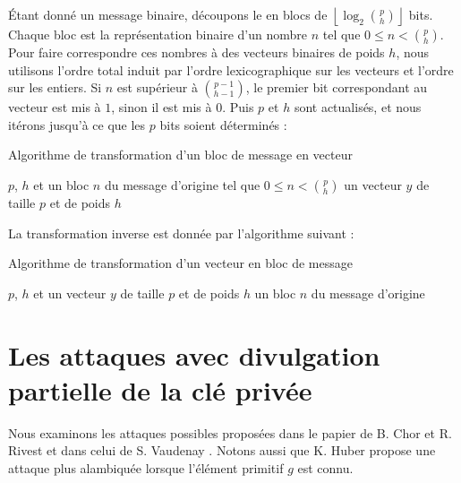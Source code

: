 \documentclass[a4paper, titlepage]{article}
\theoremstyle{definition}
\theoremstyle{remark}
\def\floor #1{\left\lfloor#1\right\rfloor}
\begin{document}
\'Etant donné un message binaire, découpons le en blocs de $\floor{\log_2\binom{p}{h}}$ bits. Chaque bloc est la représentation binaire d'un nombre $n$ tel que $0\leqslant n < \binom{p}{h}$. Pour faire correspondre ces nombres à des vecteurs binaires de poids $h$, nous utilisons l'ordre total induit par l'ordre lexicographique sur les vecteurs et l'ordre sur les entiers. Si $n$ est supérieur à $\binom{p-1}{h-1}$, le premier bit correspondant au vecteur est mis à $1$, sinon il est mis à $0$. Puis $p$ et $h$ sont actualisés, et nous itérons jusqu'à ce que les $p$ bits soient déterminés :

\begin{algorithm}[h]
\caption{Algorithme de transformation d'un bloc de message en vecteur}
\begin{algorithmic}[1]
\REQUIRE $p$, $h$ et un bloc $n$ du message d'origine tel que $0\leqslant n < \binom{p}{h}$
\ENSURE un vecteur $y$ de taille $p$ et de poids $h$
	\ELSE
	\ENDIF
\ENDFOR
{}
\end{algorithmic}
\end{algorithm}

La transformation inverse est donnée par l'algorithme suivant :
\begin{algorithm}[h]
\caption{Algorithme de transformation d'un vecteur en bloc de message}
\begin{algorithmic}[1]
\REQUIRE $p$, $h$ et un vecteur $y$ de taille $p$ et de poids $h$
\ENSURE un bloc $n$ du message d'origine
	\ENDIF
\ENDFOR
{}
\end{algorithmic}
\end{algorithm}


\section{Les attaques avec divulgation partielle de la clé privée}

Nous examinons les attaques possibles proposées dans le papier de B. Chor et R. Rivest \cite[Section VII, A]{chorRivest1988} et dans celui de S. Vaudenay \cite[Section 4]{vaudenay2000}. Notons aussi que K. Huber \cite{huber1991} propose une attaque plus alambiquée lorsque l'élément primitif $g$ est connu.
\end{document}
